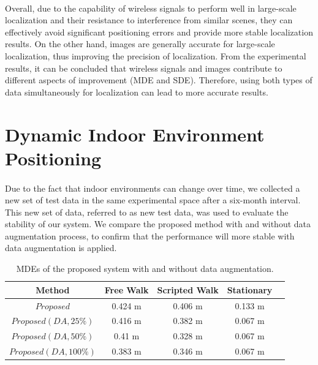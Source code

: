 \documentclass[a4paper,12pt]{report}
\begin{document}
\paragraph{}
Overall, due to the capability of wireless signals to perform well in large-scale localization and their resistance to interference from similar scenes, they can effectively avoid significant positioning errors and provide more stable localization results. On the other hand, images are generally accurate for large-scale localization, thus improving the precision of localization. From the experimental results, it can be concluded that wireless signals and images contribute to different aspects of improvement (MDE and SDE). Therefore, using both types of data simultaneously for localization can lead to more accurate results.
\section{Dynamic Indoor Environment Positioning}
\paragraph{}
Due to the fact that indoor environments can change over time, we collected a new set of test data in the same experimental space after a six-month interval. This new set of data, referred to as new test data, was used to evaluate the stability of our system. We compare the proposed method with and without data augmentation process, to confirm that the performance will more stable with data augmentation is applied.
\begin{table}[h]
    \begin{center}
    \caption{MDEs of the proposed system with and without data augmentation.}
    \label{table:5_3_MDEs}
        \begin{tabular}{|c||c|c|c|c|}
            \hline
                Method & Free Walk & Scripted Walk & Stationary \\
            \hline
            \hline
                $Proposed$ & 0.424 m  & 0.406 m  & 0.133 m \\
            \hline
                $Proposed(DA, 25\%)$   & 0.416 m  & 0.382 m  & 0.067 m \\
            \hline
                $Proposed(DA, 50\%)$    & 0.41 m & 0.328 m & 0.067 m \\
            \hline
                $Proposed(DA, 100\%)$    & 0.383 m & 0.346 m & 0.067 m \\
            \hline
        \end{tabular}
    \end{center}
\end{table}
\end{document}
